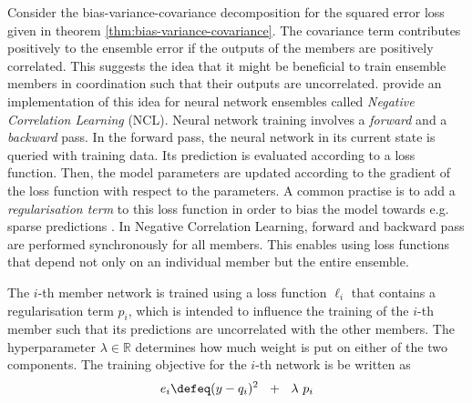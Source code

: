 \documentclass[../main.tex]{subfiles}
\begin{document}

Consider the bias-variance-covariance decomposition for the squared error loss given in theorem \ref{thm:bias-variance-covariance}.
The covariance term contributes positively to the ensemble error if the outputs of the members are positively  correlated. This suggests the idea that it might be beneficial to train ensemble members in coordination such that their outputs are uncorrelated.
\cite{liu_EnsembleLearningNegative_1999} provide an implementation of this idea for neural network ensembles called \textit{Negative Correlation Learning} (NCL).
Neural network training involves a \textit{forward} and a \textit{backward} pass. In the forward pass, the neural network in its current state is queried with training data. Its prediction is evaluated according to a loss function. 
Then, the model parameters are updated according to the gradient of the loss function with respect to the parameters. 
%
A common practise is to add a \textit{regularisation term} to this loss function in order to bias the model towards e.g. sparse predictions \cite{todo}. 
%
In Negative Correlation Learning, forward and backward pass are performed synchronously for all members. This enables using loss functions that depend not only on an individual member but the entire ensemble.

The $i$-th member network is trained using a loss function $\ell_{i}$ that contains a regularisation term $p_{i}$, which is intended to influence the training of the $i$-th member such that its predictions are uncorrelated with the other members. The hyperparameter $\lambda \in \mathbb{R}$ determines how much weight is put on either of the two components. The training objective for the $i$-th network is be written as
$$
 e_i \defeq ( y - q_{i})^2 ~ ~ + ~ ~ \lambda ~ p_{i}
$$
\end{document}
